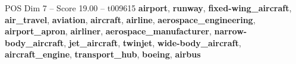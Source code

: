 \begin{textsample}{POS Dim 7 – Score 19.00 – t009615}  \label{ex:f7_pos_021}
\textbf{airport}, \textbf{runway}, \textbf{fixed-wing\_aircraft}, \textbf{air\_travel}, \textbf{aviation}, \textbf{aircraft}, \textbf{airline}, \textbf{aerospace\_engineering}, \textbf{airport\_apron}, \textbf{airliner}, \textbf{aerospace\_manufacturer}, \textbf{narrow-body\_aircraft}, \textbf{jet\_aircraft}, \textbf{twinjet}, \textbf{wide-body\_aircraft}, \textbf{aircraft\_engine}, \textbf{transport\_hub}, \textbf{boeing}, \textbf{airbus}

\end{textsample}
